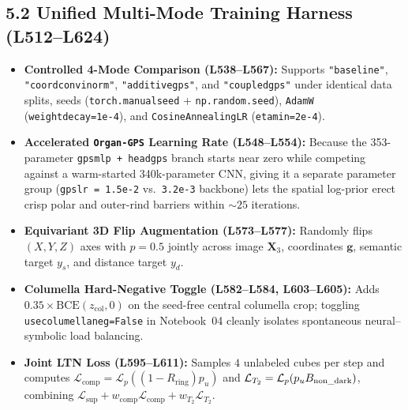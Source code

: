 \documentclass[10pt,a4paper]{article}
\renewcommand{\_}{\origunderscore\allowbreak}
\begin{document}
\subsection*{5.2 Unified Multi-Mode Training Harness (L512--L624)}
\begin{annotbox}
\begin{itemize}
    \item \textbf{Controlled 4-Mode Comparison (L538--L567):} Supports \texttt{"baseline"}, \texttt{"coordconv\_inorm"}, \texttt{"additive\_gps"}, and \texttt{"coupled\_gps"} under identical data splits, seeds (\texttt{torch.manual\_seed} + \texttt{np.random.seed}), \texttt{AdamW} (\texttt{weight\_decay=1e-4}), and \texttt{CosineAnnealingLR} (\texttt{eta\_min=2e-4}).
    \item \textbf{Accelerated \texttt{Organ-GPS} Learning Rate (L548--L554):} Because the 353-parameter \texttt{gps\_mlp + head\_gps} branch starts near zero while competing against a warm-started 340k-parameter CNN, giving it a separate parameter group (\texttt{gps\_lr = 1.5e-2} vs.\ \texttt{3.2e-3} backbone) lets the spatial log-prior erect crisp polar and outer-rind barriers within $\sim 25$ iterations.
    \item \textbf{Equivariant 3D Flip Augmentation (L573--L577):} Randomly flips $(X, Y, Z)$ axes with $p = 0.5$ jointly across image $\mathbf{X}_3$, coordinates $\mathbf{g}$, semantic target $y_s$, and distance target $y_d$.
    \item \textbf{Columella Hard-Negative Toggle (L582--L584, L603--L605):} Adds $0.35 \times \text{BCE}(z_{\text{col}}, 0)$ on the seed-free central columella crop; toggling \texttt{use\_columella\_neg=False} in Notebook~04 cleanly isolates spontaneous neural--symbolic load balancing.
    \item \textbf{Joint LTN Loss (L595--L611):} Samples $4$ unlabeled cubes per step and computes $\mathcal{L}_{\text{comp}} = \mathcal{L}_p((1 - R_{\text{ring}})p_u)$ and $\mathcal{L}_{T_2} = \mathcal{L}_p(p_u B_{\text{non\_dark}})$, combining $\mathcal{L}_{\text{sup}} + w_{\text{comp}}\mathcal{L}_{\text{comp}} + w_{T_2}\mathcal{L}_{T_2}$.
\end{itemize}
\end{annotbox}
\end{document}
